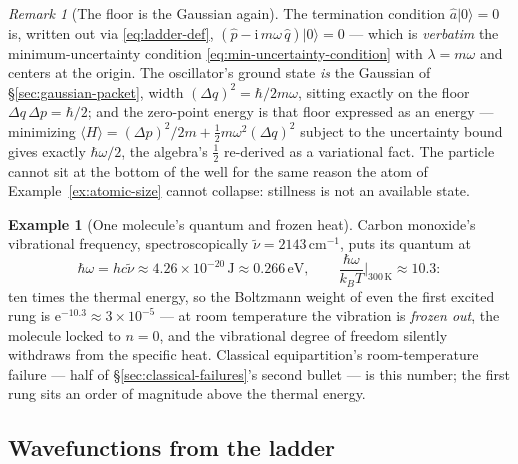 \documentclass[11pt]{article}
\theoremstyle{plain}
\theoremstyle{definition}
\newtheorem{example}[theorem]{Example}
\theoremstyle{remark}
\newtheorem{remark}[theorem]{Remark}
\newcommand{\ee}{\mathrm{e}}
\newcommand{\ii}{\mathrm{i}}
\newcommand{\op}[1]{\hat{#1}}
\newcommand{\ket}[1]{\lvert #1 \rangle}
\begin{document}
\begin{remark}[The floor is the Gaussian again]
\label{rem:sho-ground-gaussian}
The termination condition $\op a\ket 0 = 0$ is, written out via
\eqref{eq:ladder-def},
$(\op p - \ii\, m\omega\,\op q)\ket 0 = 0$ --- which is
\emph{verbatim} the minimum-uncertainty condition
\eqref{eq:min-uncertainty-condition} with $\lambda = m\omega$ and
centers at the origin. The oscillator's ground state \emph{is} the
Gaussian of \S\ref{sec:gaussian-packet}, width
$(\Delta q)^2 = \hbar/2m\omega$, sitting exactly on the floor
$\Delta q\,\Delta p = \hbar/2$; and the zero-point energy is that
floor expressed as an energy --- minimizing
$\langle H\rangle = (\Delta p)^2/2m + \tfrac12 m\omega^2(\Delta q)^2$
subject to the uncertainty bound gives exactly $\hbar\omega/2$, the
algebra's $\tfrac12$ re-derived as a variational fact. The particle
cannot sit at the bottom of the well for the same reason the atom of
Example~\ref{ex:atomic-size} cannot collapse: stillness is
not an available state.
\end{remark}

\begin{example}[One molecule's quantum and frozen heat]
\label{ex:CO}
Carbon monoxide's vibrational frequency, spectroscopically
$\tilde\nu = 2143\,\mathrm{cm}^{-1}$, puts its quantum at
\begin{equation}
  \hbar\omega = hc\tilde\nu
  \approx 4.26\times10^{-20}\,\mathrm J
  \approx 0.266\,\mathrm{eV},
  \qquad
  \frac{\hbar\omega}{k_B T}\bigg|_{300\,\mathrm K}
  \approx 10.3 :
\end{equation}
ten times the thermal energy, so the Boltzmann weight of even the
first excited rung is $\ee^{-10.3} \approx 3\times10^{-5}$ --- at
room temperature the vibration is \emph{frozen out}, the molecule
locked to $n = 0$, and the vibrational degree of freedom silently
withdraws from the specific heat. Classical equipartition's
room-temperature failure --- half of
\S\ref{sec:classical-failures}'s second bullet --- is this number;
the first rung sits an order of magnitude above the thermal
energy.
\end{example}

\subsection{Wavefunctions from the ladder}
\label{sec:sho-wavefunctions}
\end{document}
